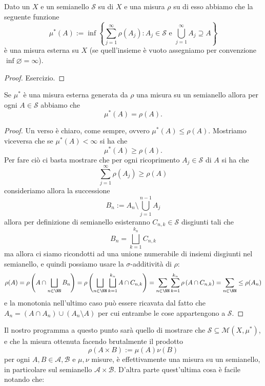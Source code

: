 \documentclass[11pt]{scrartcl}
\newcommand{\eset}{\varnothing}
\begin{document}
	\begin{proposition}
		Dato un $X$ e un semianello $\mathcal{S}$ su di $X$ e una misura $\rho$ su di esso abbiamo che la seguente funzione
		$$\mu^*(A):=\inf \left\{\sum_{j=1}^{\infty}\rho(A_j):A_j\in \mathcal{S}\,\,\text{e}\,\, \bigcup_{j=1}^\infty A_j \supseteq A\right\}$$
		è una misura esterna su $X$ (se quell'insieme è vuoto assegniamo per convenzione $\inf \eset =\infty$).
	\end{proposition}
	\begin{proof}
		Esercizio.
	\end{proof}
	\begin{proposition}
		Se $\mu^*$ è una misura esterna generata da $\rho$ una misura su un semianello allora per ogni $A\in \mathcal{S}$ abbiamo che 
		$$\mu^*(A)=\rho(A).$$
	\end{proposition}
	\begin{proof}
		Un verso è chiaro, come sempre, ovvero $\mu^*(A)\le \rho(A)$. Mostriamo viceversa che se $\mu^*(A)<\infty$ si ha che 
		$$\mu^*(A)\ge \rho(A).$$
		Per fare ciò ci basta mostrare che per ogni ricoprimento $A_j\in \mathcal{S}$ di $A$ si ha che 
		$$\sum_{j=1}^{\infty}\rho(A_j)\ge \rho(A)$$
		consideriamo allora la successione
		$$B_n:=A_n\setminus\bigcup_{j=1}^{n-1}A_j$$
		allora per definizione di semianello esisteranno $C_{n,k}\in \mathcal{S}$ disgiunti tali che
		$$B_n=\bigsqcup_{k=1}^{k_n}C_{n,k}$$
		ma allora ci siamo ricondotti ad una unione numerabile di insiemi disgiunti nel semianello, e quindi possiamo usare la $\sigma$-additività di $\rho$:
		$$\rho(A)=\rho\left(A\cap \bigsqcup_{n\in\NN}B_n\right)=\rho\left(\bigsqcup_{n\in\NN}\bigsqcup_{k=1}^{k_n}A\cap C_{n,k}\right)=\sum_{n\in\NN}\sum_{k=1}^{k_n}\rho\left(A\cap C_{n,k}\right)=\sum_{n\in\NN}\le \rho(A_n)$$
		e la monotonia nell'ultimo caso può essere ricavata dal fatto che $A_n=\left(A\cap A_n\right)\cup \left(A_n\setminus A\right)$ per cui entrambe le cose appartengono a $\mathcal{S}$.
	\end{proof}
	Il nostro programma a questo punto sarà quello di mostrare che $\mathcal{S}\subseteq \mathcal{M}(X,\mu^*)$, e che la misura ottenuta facendo brutalmente il prodotto 
	$$\rho(A\times B):=\mu(A)\nu(B)$$
	per ogni $A,B\in \mathcal{A},\mathcal{B}$ e $\mu,\nu$ misure, è effettivamente una misura su un semianello, in particolare sul semianello $\mathcal{A}\times \mathcal{B}$. D'altra parte quest'ultima cosa è facile notando che:
\end{document}
